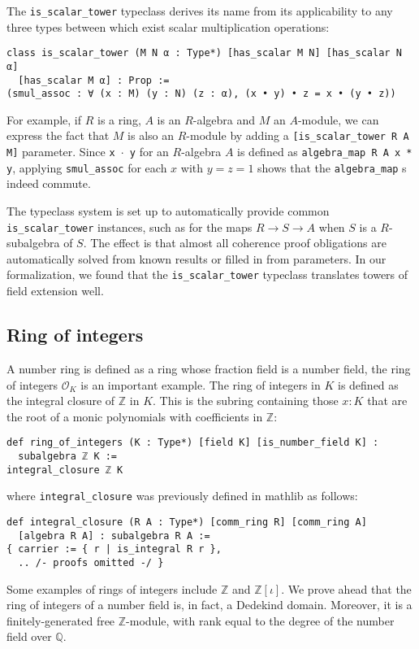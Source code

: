 \documentclass[a4paper,USenglish,cleveref, autoref, thm-restate]{lipics-v2021}
\newcommand{\lean}[1]{\texttt{#1}\xspace} %
\newcommand*{\OK}[1][K]{\mathcal{O}_{#1}}
\newcommand{\Q}{\mathbb{Q}}
\newcommand{\Z}{\mathbb{Z}}
\begin{document}
The \lean{is\_scalar\_tower} typeclass derives its name from its applicability to any three types between which exist scalar multiplication operations:
\begin{lstlisting}
class is_scalar_tower (M N α : Type*) [has_scalar M N] [has_scalar N α]
  [has_scalar M α] : Prop :=
(smul_assoc : ∀ (x : M) (y : N) (z : α), (x • y) • z = x • (y • z))
\end{lstlisting}
For example, if $R$ is a ring, $A$ is an $R$-algebra and $M$ an $A$-module, we can express the fact that $M$ is also an $R$-module by adding a \lean{[is\_scalar\_tower R A M]} parameter.
Since \lean{x $\cdot$ y} for an $R$-algebra $A$ is defined as \lean{algebra\_map R A x * y}, applying \lean{smul\_assoc} for each $x$ with $y = z = 1$ shows that the \lean{algebra\_map}s indeed commute.

The typeclass system is set up to automatically provide common \lean{is\_scalar\_tower} instances,
such as for the maps $R \to S \to A$ when $S$ is a $R$-subalgebra of $S$.
The effect is that almost all coherence proof obligations are automatically solved from known results or filled in from parameters.
In our formalization, we found that the \lean{is\_scalar\_tower} typeclass translates towers of field extension well.

\subsection{Ring of integers} \label{sec:ring-of-integers}

A number ring is defined as a ring whose fraction field is a number field, the ring of integers $\OK$ is an important example.
The ring of integers in $K$ is defined as the integral closure of $\Z$ in $K$.
This is the subring containing those $x : K$ that are the root of a monic polynomials with coefficients in $\Z$:
\begin{lstlisting}
def ring_of_integers (K : Type*) [field K] [is_number_field K] :
  subalgebra ℤ K :=
integral_closure ℤ K
\end{lstlisting}
where \lean{integral\_closure} was previously defined in mathlib as follows:
\begin{lstlisting}
def integral_closure (R A : Type*) [comm_ring R] [comm_ring A]
  [algebra R A] : subalgebra R A :=
{ carrier := { r | is_integral R r },
  .. /- proofs omitted -/ }
\end{lstlisting}

Some examples of rings of integers include $\Z$ and $\Z[\iota]$. We prove ahead that the ring of integers of a number field is, in fact, a Dedekind domain. Moreover, it is a finitely-generated free $\Z$-module, with rank equal to the degree of the number field over $\Q$.
\end{document}
